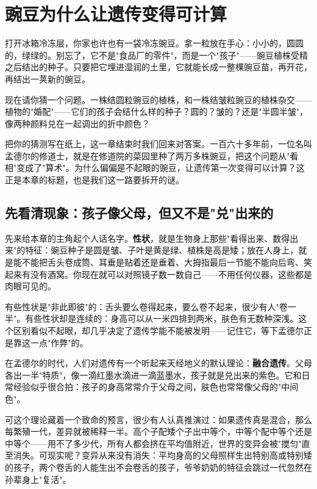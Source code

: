 \chapter{豌豆为什么让遗传变得可计算}

\begin{kaichang}
打开冰箱冷冻层，你家也许也有一袋冷冻豌豆。拿一粒放在手心：小小的，圆圆的，绿绿的。别忘了，它不是"食品厂的零件"，而是一个"孩子"——豌豆植株受精之后结出的种子。只要把它埋进湿润的土里，它就能长成一整棵豌豆苗，再开花，再结出一荚新的豌豆。

现在请你猜一个问题。一株结圆粒豌豆的植株，和一株结皱粒豌豆的植株杂交——植物的"婚配"——它们的孩子会结什么样的种子？圆的？皱的？还是"半圆半皱"，像两种颜料兑在一起调出的折中颜色？

把你的猜测写在纸上，这一章结束时我们回来对答案。一百六十多年前，一位名叫孟德尔的修道士，就是在修道院的菜园里种了两万多株豌豆，把这个问题从"看相"变成了"算术"。为什么偏偏是不起眼的豌豆，让遗传第一次变得可以计算？这正是本章的标题，也是我们这一路要拆开的谜。
\end{kaichang}

\section{先看清现象：孩子像父母，但又不是"兑"出来的}

先来给本章的主角起个人话名字。\textbf{性状}，就是生物身上那些"看得出来、数得出来"的特征：豌豆种子是圆是皱、子叶是黄是绿、植株是高是矮；放在人身上，就是能不能把舌头卷成筒、耳垂是贴着还是垂着、大拇指最后一节能不能向后弯、笑起来有没有酒窝。你现在就可以对照镜子数一数自己——不用任何仪器，这些都是肉眼可见的。

有些性状是"非此即彼"的：舌头要么卷得起来，要么卷不起来，很少有人"卷一半"。有些性状却是连续的：身高可以从一米四排到两米，肤色有无数种深浅。这个区别看似不起眼，却几乎决定了遗传学能不能被发明——记住它，等下孟德尔正是靠这一点"作弊"的。

在孟德尔的时代，人们对遗传有一个听起来天经地义的默认理论：\textbf{融合遗传}。父母各出一半"特质"，像一滴红墨水滴进一滴蓝墨水，孩子就是兑出来的紫色。它和日常经验似乎很合拍：孩子的身高常常介于父母之间，肤色也常常像父母的"中间色"。

可这个理论藏着一个致命的预言，很少有人认真推演过：如果遗传真是混合，那么每繁殖一代，差异就被稀释一半。高个子配矮个子出中等个，中等个配中等个还是中等个——用不了多少代，所有人都会挤在平均值附近，世界的变异会被"搅匀"直至消失。可现实呢？变异从来没有消失：平均身高的父母照样生出特别高或特别矮的孩子，两个卷舌的人能生出不会卷舌的孩子，爷爷奶奶的特征会跳过一代忽然在孙辈身上"复活"。

